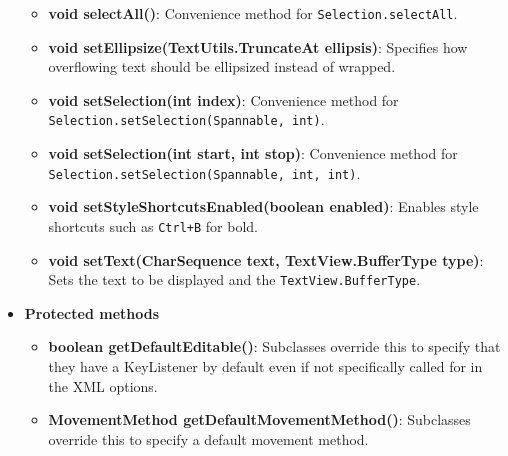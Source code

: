 \documentclass{report}
\begin{document}
\begin{itemize}
\begin{itemize}
                \item \textbf{void selectAll()}: Convenience method for \texttt{Selection.selectAll}.
                \item \textbf{void setEllipsize(TextUtils.TruncateAt ellipsis)}: Specifies how overflowing text should be ellipsized instead of wrapped.
                \item \textbf{void setSelection(int index)}: Convenience method for \texttt{Selection.setSelection(Spannable, int)}.
                \item \textbf{void setSelection(int start, int stop)}: Convenience method for \texttt{Selection.setSelection(Spannable, int, int)}.
                \item \textbf{void setStyleShortcutsEnabled(boolean enabled)}: Enables style shortcuts such as \texttt{Ctrl+B} for bold.
                \item \textbf{void setText(CharSequence text, TextView.BufferType type)}: Sets the text to be displayed and the \texttt{TextView.BufferType}.
            \end{itemize}

        \item \textbf{Protected methods}
            \begin{itemize}
                \item \textbf{boolean getDefaultEditable()}: Subclasses override this to specify that they have a KeyListener by default even if not specifically called for in the XML options.
                \item \textbf{MovementMethod getDefaultMovementMethod()}: Subclasses override this to specify a default movement method.
            \end{itemize}

    \end{itemize}

    \pagebreak 
\end{document}
